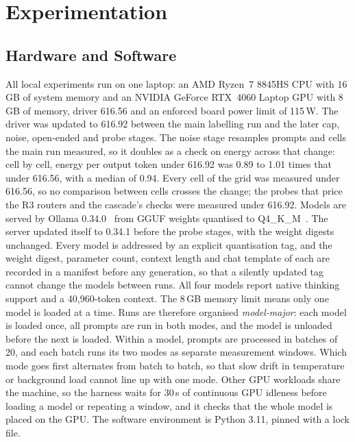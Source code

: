 \section{Experimentation}
\label{sec:experimentation}

\subsection{Hardware and Software}
\label{sec:hardware}

All local experiments run on one laptop: an AMD Ryzen~7 8845HS CPU with
16\,GB of system memory and an NVIDIA GeForce RTX~4060 Laptop GPU with
8\,GB of memory, driver 616.56 and an enforced board power limit of 115\,W.
The driver was updated to 616.92 between the main labelling run and the
later cap, noise, open-ended and probe stages. The noise stage resamples
prompts and cells the main run measured, so it doubles as a check on energy
across that change: cell by cell, energy per output token under 616.92 was
0.89 to 1.01 times that under 616.56, with a median of 0.94. Every cell of
the grid was measured under 616.56, so no comparison between cells crosses
the change; the probes that price the R3 routers and the cascade's checks
were measured under 616.92.
Models are served by Ollama 0.34.0~\cite{ollama} from GGUF weights
quantised to Q4\_K\_M~\cite{gerganov2023llamacpp}. The server updated
itself to 0.34.1 before the probe stages, with the weight digests
unchanged.
Every model is addressed by an explicit quantisation tag, and the weight
digest, parameter count, context length and chat template of each are
recorded in a manifest before any generation, so that a silently updated
tag cannot change the models between runs. All four models report native
thinking support and a 40{,}960-token context. The 8\,GB memory limit means
only one model is loaded at a time. Runs are therefore organised
\emph{model-major}: each model is loaded once, all prompts are run in both
modes, and the model is unloaded before the next is loaded. Within a model,
prompts are processed in batches of 20, and each batch runs its two modes as
separate measurement windows. Which mode goes first alternates from batch to
batch, so that slow drift in temperature or background load cannot line up
with one mode. Other GPU workloads share the machine, so the harness waits
for 30\,s of continuous GPU idleness before loading a model or repeating a
window, and it checks that the whole model is placed on the GPU. The
software environment is Python 3.11, pinned with a lock file.

